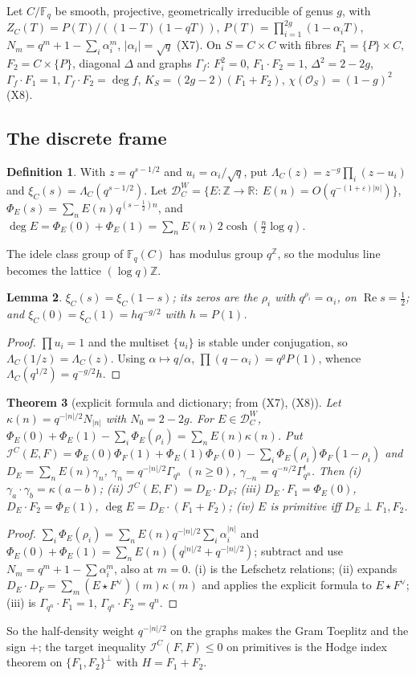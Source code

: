\documentclass[11pt]{amsart}
\newtheorem{theorem}{Theorem}[section]
\newtheorem{lemma}[theorem]{Lemma}
\theoremstyle{definition}
\newtheorem{definition}[theorem]{Definition}
\theoremstyle{remark}
\newcommand{\R}{\mathbb R}
\newcommand{\Z}{\mathbb Z}
\newcommand{\F}{\mathbb F}
\newcommand{\Rel}{\operatorname{Re}}
\newcommand{\DW}{\mathcal D^{W}}
\newcommand{\I}{\mathcal I}
\newcommand{\dg}{\deg}
\begin{document}
Let $C/\F_q$ be smooth, projective, geometrically irreducible of genus $g$, with
$Z_C(T)=P(T)/((1-T)(1-qT))$, $P(T)=\prod_{i=1}^{2g}(1-\alpha_iT)$, $N_m=q^m+1-\sum_i\alpha_i^m$, $|\alpha_i|=\sqrt q$ (X7).
On $S=C\times C$ with fibres $F_1=\{P\}\times C$, $F_2=C\times\{P\}$, diagonal $\Delta$ and graphs $\Gamma_f$:
$F_i^2=0$, $F_1\cdot F_2=1$, $\Delta^2=2-2g$, $\Gamma_f\cdot F_1=1$, $\Gamma_f\cdot F_2=\deg f$,
$K_S=(2g-2)(F_1+F_2)$, $\chi(\mathcal O_S)=(1-g)^2$ (X8).

\subsection{The discrete frame}
\begin{definition}\label{def:curveframe}
With $z=q^{s-1/2}$ and $u_i=\alpha_i/\sqrt q$, put $\Lambda_C(z)=z^{-g}\prod_i(z-u_i)$ and $\xi_C(s)=\Lambda_C(q^{s-1/2})$.
Let $\DW_C=\{E:\Z\to\R:\ E(n)=O(q^{-(1+\varepsilon)|n|})\}$, $\Phi_E(s)=\sum_nE(n)q^{(s-\frac12)n}$, and
$\dg E=\Phi_E(0)+\Phi_E(1)=\sum_nE(n)\,2\cosh(\frac n2\log q)$.
\end{definition}
The idele class group of $\F_q(C)$ has modulus group $q^\Z$, so the modulus line becomes the lattice $(\log q)\Z$.

\begin{lemma}\label{lem:xiC}
$\xi_C(s)=\xi_C(1-s)$; its zeros are the $\rho_i$ with $q^{\rho_i}=\alpha_i$, on $\Rel s=\frac12$; and
$\xi_C(0)=\xi_C(1)=hq^{-g/2}$ with $h=P(1)$.
\end{lemma}
\begin{proof}
$\prod u_i=1$ and the multiset $\{u_i\}$ is stable under conjugation, so $\Lambda_C(1/z)=\Lambda_C(z)$. Using $\alpha\mapsto q/\alpha$,
$\prod(q-\alpha_i)=q^gP(1)$, whence $\Lambda_C(q^{1/2})=q^{-g/2}h$.
\end{proof}

\begin{theorem}[explicit formula and dictionary; from (X7), (X8)]\label{thm:dict}
Let $\kappa(n)=q^{-|n|/2}N_{|n|}$ with $N_0=2-2g$. For $E\in\DW_C$,
$\Phi_E(0)+\Phi_E(1)-\sum_i\Phi_E(\rho_i)=\sum_nE(n)\kappa(n)$. Put
$\I^C(E,F)=\Phi_E(0)\Phi_F(1)+\Phi_E(1)\Phi_F(0)-\sum_i\Phi_E(\rho_i)\Phi_F(1-\rho_i)$ and
$D_E=\sum_nE(n)\gamma_n$, $\gamma_n=q^{-|n|/2}\Gamma_{q^n}$ $(n\ge0)$, $\gamma_{-n}=q^{-n/2}\Gamma_{q^n}^t$. Then
(i) $\gamma_a\cdot\gamma_b=\kappa(a-b)$; (ii) $\I^C(E,F)=D_E\cdot D_F$; (iii) $D_E\cdot F_1=\Phi_E(0)$,
$D_E\cdot F_2=\Phi_E(1)$, $\dg E=D_E\cdot(F_1+F_2)$; (iv) $E$ is primitive iff $D_E\perp F_1,F_2$.
\end{theorem}
\begin{proof}
$\sum_i\Phi_E(\rho_i)=\sum_nE(n)q^{-|n|/2}\sum_i\alpha_i^{|n|}$ and $\Phi_E(0)+\Phi_E(1)=\sum_nE(n)(q^{|n|/2}+q^{-|n|/2})$;
subtract and use $N_m=q^m+1-\sum\alpha_i^m$, also at $m=0$. (i) is the Lefschetz relations; (ii) expands
$D_E\cdot D_F=\sum_m(E\star F^\vee)(m)\kappa(m)$ and applies the explicit formula to $E\star F^\vee$; (iii) is
$\Gamma_{q^n}\cdot F_1=1$, $\Gamma_{q^n}\cdot F_2=q^n$.
\end{proof}
So the half-density weight $q^{-|n|/2}$ on the graphs makes the Gram Toeplitz and the sign $+$; the target
inequality $\I^C(F,F)\le0$ on primitives is the Hodge index theorem on $\{F_1,F_2\}^\perp$ with $H=F_1+F_2$.
\end{document}
